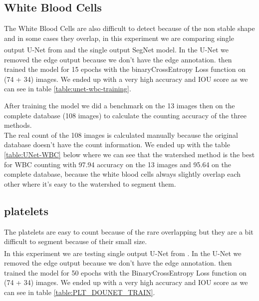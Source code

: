 \subsection{White Blood Cells}
\hspace{\parindent}
The White Blood Cells are also difficult to detect because of the non stable shape and in some cases they overlap, in this experiment we are comparing single output U-Net from \textsuperscript{\cite{10.1007/978-3-030-44584-3_31}} and the single output SegNet model.
In the U-Net we removed the edge output because we don't have the edge annotation. then trained the model for 15 epochs with the binaryCrossEntropy Loss function on (74 + 34) images. 
We ended up with a very high accuracy and IOU score as we can see in table \ref{table:unet-wbc-training}.



After training the model we did a benchmark on the 13 images then on the complete database (108 images) to calculate the counting accuracy of the three methods.\\ 
The real count of the 108 images is calculated manually because the original database doesn't have the count information. We ended up with the table \ref{table:UNet-WBC} below where we can see that the watershed method is the best for WBC counting with 97.94 accuracy on the 13 images and 95.64 on the complete database, because the white blood cells always slightly overlap each other where it's easy to the watershed to segment them.



\subsection{platelets}
\hspace{\parindent}
The platelets are easy to count because of the rare overlapping but they are a bit difficult to segment because of their small size.\\
In this experiment we are testing single output U-Net from \textsuperscript{\cite{10.1007/978-3-030-44584-3_31}}. In the U-Net we removed the edge output because we don’t have the edge annotation.
then trained the model for 50 epochs with the BinaryCrossEntropy Loss function on (74 + 34) images.
We ended up with a very high accuracy and IOU score as we can see in table \ref{table:PLT_DOUNET_TRAIN}.



